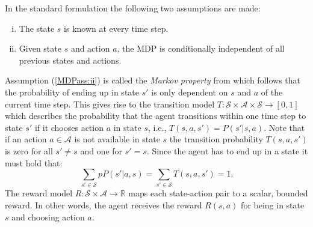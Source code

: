 In the standard formulation the following two assumptions are made:
\begin{enumerate}[(i)]
    \item\label{MDPass:i} The state $s$ is known at every time step.
    \item\label{MDPass:ii} Given state $s$ and action $a$, the MDP is conditionally independent of all previous states and actions.
\end{enumerate}
Assumption (\ref{MDPass:ii}) is called the \textit{Markov property} from which follows that the probability of ending up in  state $s'$ is only dependent on $s$ and $a$ of the current time step. This gives rise to the transition model $T:\mathcal{S}\times\mathcal{A}\times\mathcal{S}\rightarrow [0,1]$ which describes the probability that the agent transitions within one time step to state $s'$ if it chooses action $a$ in state $s$, i.e., $T(s,a,s')=P(s'|s,a)$. Note that if an action $a\in\mathcal{A}$ is not available in state $s$ the transition probability $T(s,a,s')$ is zero for all $s'\neq s$ and one for $s'=s$. 
Since the agent has to end up in a state it must hold that:
%
\begin{equation}
    \sum_{s'\in\mathcal{S}}pP(s'|a,s)=\sum_{s'\in\mathcal{S}}T(s,a,s')=1.
\end{equation}
%
The reward model $R:\mathcal{S}\times\mathcal{A}\rightarrow \mathbb{R}$ maps each state-action pair to a scalar, bounded reward. In other words, the agent receives the reward $R(s,a)$ for being in state $s$ and choosing action $a$.\\

